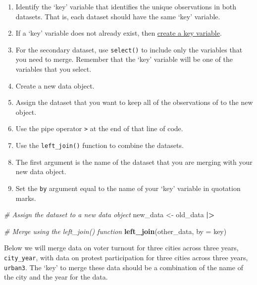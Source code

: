 \documentclass[
]{book}
\newenvironment{Shaded}{\begin{snugshade}}{\end{snugshade}}
\newcommand{\AttributeTok}[1]{\textcolor[rgb]{0.13,0.29,0.53}{#1}}
\newcommand{\CommentTok}[1]{\textcolor[rgb]{0.56,0.35,0.01}{\textit{#1}}}
\newcommand{\FunctionTok}[1]{\textcolor[rgb]{0.13,0.29,0.53}{\textbf{#1}}}
\newcommand{\NormalTok}[1]{#1}
\newcommand{\OtherTok}[1]{\textcolor[rgb]{0.56,0.35,0.01}{#1}}
\newcommand{\SpecialCharTok}[1]{\textcolor[rgb]{0.81,0.36,0.00}{\textbf{#1}}}
\newcommand{\StringTok}[1]{\textcolor[rgb]{0.31,0.60,0.02}{#1}}
\providecommand{\tightlist}{%
  \setlength{\itemsep}{0pt}\setlength{\parskip}{0pt}}
\begin{document}
\begin{enumerate}
\def\labelenumi{\arabic{enumi}.}
\tightlist
\item
  Identify the `key' variable that identifies the unique observations in both datasets. That is, each dataset should have the same `key' variable.
\item
  If a `key' variable does not already exist, then \protect\hyperlink{key}{create a key variable}.
\item
  For the secondary dataset, use \texttt{select()} to include only the variables that you need to merge. Remember that the `key' variable will be one of the variables that you select.
\item
  Create a new data object.
\item
  Assign the dataset that you want to keep all of the observations of to the new object.
\item
  Use the pipe operator \texttt{\textbar{}\textgreater{}} at the end of that line of code.
\item
  Use the \texttt{left\_join()} function to combine the datasets.
\item
  The first argument is the name of the dataset that you are merging with your new data object.
\item
  Set the \texttt{by} argument equal to the name of your `key' variable in quotation marks.
\end{enumerate}

\begin{Shaded}
\begin{Highlighting}[]
\CommentTok{\# Assign the dataset to a new data object}
\NormalTok{new\_data }\OtherTok{\textless{}{-}}\NormalTok{ old\_data }\SpecialCharTok{|\textgreater{}}
  
  \CommentTok{\# Merge using the \textasciigrave{}left\_join()\textasciigrave{} function}
  \FunctionTok{left\_join}\NormalTok{(other\_data, }\AttributeTok{by =} \StringTok{\textquotesingle{}key\textquotesingle{}}\NormalTok{)}
\end{Highlighting}
\end{Shaded}

Below we will merge data on voter turnout for three cities across three years, \texttt{city\_year}, with data on protest participation for three cities across three years, \texttt{urban3}. The `key' to merge these data should be a combination of the name of the city and the year for the data.
\end{document}
